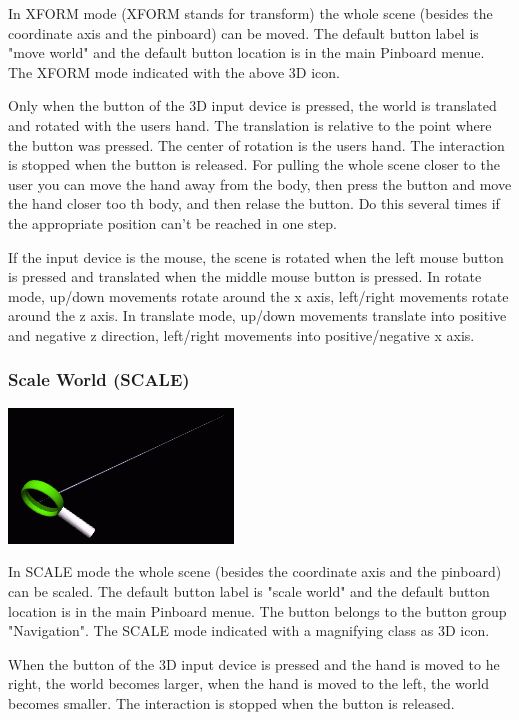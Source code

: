 In XFORM mode (XFORM stands for transform) the whole scene 
(besides the coordinate axis and the pinboard) can be moved. 
The default button label is "move world" and
the default button location is in the main Pinboard menue. 
The XFORM mode indicated with the above 3D icon.

Only when the button of the 3D input device is pressed, the world
is translated and rotated with the users hand. The translation is relative 
to the point where the button was pressed. The center of rotation is the users
hand. The interaction is stopped when the button is released. For pulling
the whole scene closer to the user you can move the hand away from the body, 
then press the button and move the hand closer too th body, and then relase 
the button. Do this several times if the appropriate position can't be 
reached in one step. 

If the input device is the mouse, the scene is rotated when the left
mouse button is pressed and translated when the middle mouse button
is pressed. In rotate mode, up/down movements rotate around the x axis, 
left/right movements rotate around the z axis. In translate mode, up/down
movements translate into positive and negative z direction, left/right movements 
into positive/negative x axis.
		
\subsubsection{Scale World (SCALE)}
\latexonly
\includegraphics[scale=0.5]{cover/pict/scale} 
\endlatexonly
{}

In SCALE mode the whole scene (besides the coordinate axis and the pinboard) 
can be scaled. 
The default button label is "scale world" and
the default button location is in the main Pinboard menue. 
The button belongs to the button group "Navigation".
The SCALE mode indicated with a magnifying class as 3D icon.

When the button of the 3D input device is pressed and the hand is
moved to he right, the world becomes larger, when the hand is moved
to the left, the world becomes smaller. The interaction is stopped when the
button is released.

